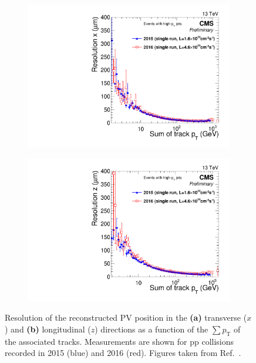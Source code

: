 \begin{figure}[h]
    \centering
    \begin{subfigure}[b]{0.49\textwidth}
        \centering
        \includegraphics[width=\textwidth]{Figures/Chapter4/resolution_sumpt_x.pdf}
        \caption{}
    \end{subfigure}
    \begin{subfigure}[b]{0.49\textwidth}
        \centering
        \includegraphics[width=\textwidth]{Figures/Chapter4/resolution_sumpt_z.pdf}
        \caption{}
    \end{subfigure}
\caption[Resolution of the reconstructed transverse and longitudinal positions of the primary vertex using CMS collision data (2015 \& 2016)]{Resolution of the reconstructed PV position in the \textbf{(a)} transverse ($x$) and \textbf{(b)} longitudinal ($z$) directions as a function of the $\sum p_\mathrm{T}$ of the associated tracks. Measurements are shown for pp collisions recorded in 2015 (blue) and 2016 (red). Figures taken from Ref.~\cite{PrimaryVertex_Resolution}.}

\label{Figure:Chapter4_PrimaryVertex_Resolution}
\end{figure}

